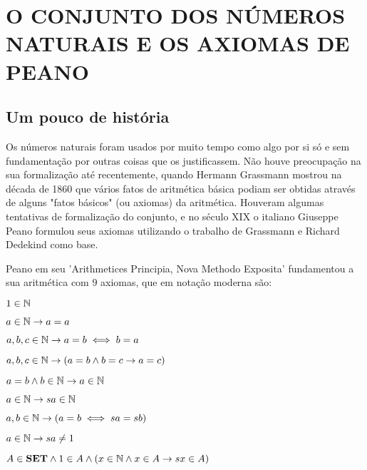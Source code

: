 \documentclass[../main.tex]{subfiles}
\begin{document}
\chapter{O CONJUNTO DOS NÚMEROS NATURAIS E OS AXIOMAS DE PEANO}

\section{Um pouco de história}
Os números naturais foram usados por muito tempo como algo por si só e sem fundamentação por outras coisas que os justificassem. Não houve preocupação na sua formalização até recentemente, quando Hermann Grassmann mostrou na década de 1860 que vários fatos de aritmética básica podiam ser obtidas através de alguns "fatos básicos" (ou axiomas) da aritmética.
Houveram algumas tentativas de formalização do conjunto, e no século XIX o italiano Giuseppe Peano formulou seus axiomas utilizando o trabalho de Grassmann e Richard Dedekind como base.

Peano em seu 'Arithmetices Principia, Nova Methodo Exposita' fundamentou a sua aritmética com $9$ axiomas, que em notação moderna são:
\begin{peano}
    $1 \in \mathbb{N}$
\end{peano}
\begin{peano}
    $a \in \mathbb{N} \rightarrow a = a$
\end{peano}
\begin{peano}
    $a,b,c \in \mathbb{N} \rightarrow a = b \iff b = a$
\end{peano}
\begin{peano}
    $a,b,c \in \mathbb{N} \rightarrow (a = b \land b = c \rightarrow a = c) $
\end{peano}
\begin{peano}
    $a = b \land b \in \mathbb{N} \rightarrow a \in \mathbb{N}$
\end{peano}
\begin{peano}
    $a \in \mathbb{N} \rightarrow sa \in \mathbb{N}$
\end{peano}
\begin{peano}
    $a,b \in \mathbb{N} \rightarrow (a = b \iff sa = sb)$
\end{peano}
\begin{peano}
    $a \in \mathbb{N} \rightarrow sa \neq 1$
\end{peano}
\begin{peano}
    $A \in \textbf{SET} \land 1 \in A \land (x \in \mathbb{N} \land x \in A \rightarrow sx \in A)$
\end{peano}
\end{document}
